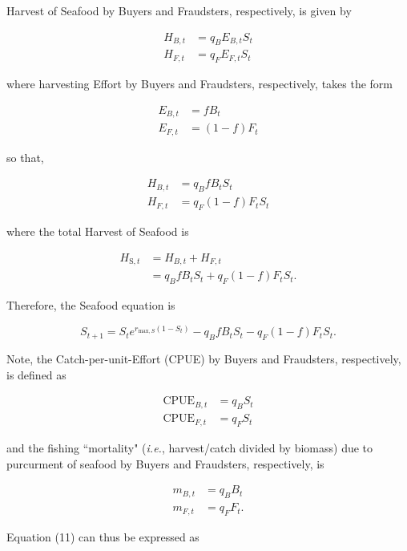 \documentclass[12pt]{article}
\begin{document}
Harvest of Seafood by Buyers and Fraudsters, respectively, is given by 

\begin{align}
H_{B, t} &= q_{B}E_{B, t}S_t \\
H_{F, t} &= q_{F}E_{F, t}S_t
\end{align}

\noindent where harvesting Effort by Buyers and Fraudsters, respectively, takes the form

\begin{align}
E_{B, t} &= f B_t \\
E_{F, t} &= (1 - f) F_t
\end{align}

\noindent so that,

\begin{align}
H_{B, t} &= q_{B}f B_tS_t \\
H_{F, t} &= q_{F}(1 - f) F_tS_t
\end{align}

where the total Harvest of Seafood is

\begin{align}
H_{\mathrm{S}, t} &= H_{B, t} + H_{F, t} \\
 &= q_{B}f B_tS_t + q_{F}(1 - f) F_tS_t.
\end{align}

Therefore, the Seafood equation is 

\begin{equation}
S_{t+1} = S_te^{r_{\mathrm{max}, S}(1 - S_t)} - q_{B}f B_tS_t - q_{F}(1 - f)F_tS_t.
\end{equation}

Note, the Catch-per-unit-Effort (CPUE) by Buyers and Fraudsters, respectively, is defined as

\begin{align}
\mathrm{CPUE}_{B, t} &= q_{B}S_t \\
\textrm{CPUE}_{F, t} &= q_{F}S_t
\end{align}

\noindent and the fishing ``mortality" (\textit{i.e.}, harvest/catch divided by biomass) due to purcurment of seafood by Buyers and Fraudsters, respectively, is

\begin{align}
m_{B, t} &= q_{B} B_t \\
m_{F, t} &= q_{F} F_t.
\end{align}

Equation (11) can thus be expressed as
\end{document}
